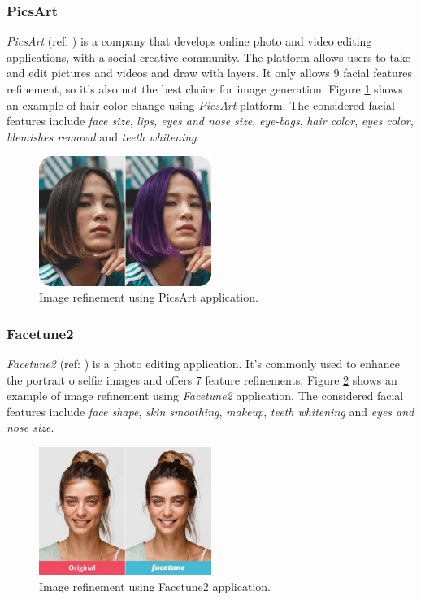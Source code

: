 \subsubsection{PicsArt}
\emph{PicsArt} (ref: ) is a company that develops online photo and video editing applications, with a social creative community. The platform allows users to take and edit pictures and videos and draw with layers. It only allows $9$ facial features refinement, so it's also not the best choice for image generation. Figure \ref{fig:picsArt} shows an example of hair color change using \emph{PicsArt} platform. The considered facial features include \emph{face size}, \emph{lips, eyes and nose size}, \emph{eye-bags}, \emph{hair color}, \emph{eyes color}, \emph{blemishes removal} and \emph{teeth whitening}.

\begin{figure}[H]
    \centering
    \includegraphics[width=0.5\textwidth]{images/picsArt.png}
    \caption{Image refinement using PicsArt application.}
    \label{fig:picsArt}
\end{figure}

\subsubsection{Facetune2}
\emph{Facetune2} (ref: ) is a photo editing application. It's commonly used to enhance the portrait o selfie images and offers $7$ feature refinements. Figure \ref{fig:FaceTune2} shows an example of image refinement using \emph{Facetune2} application. The considered facial features include \emph{face shape}, \emph{skin smoothing}, \emph{makeup}, \emph{teeth whitening} and \emph{eyes and nose size}.

\begin{figure}[H]
    \centering
    \includegraphics[width=0.5\textwidth]{images/FaceTune.jpg}
    \caption{Image refinement using Facetune2 application.}
    \label{fig:FaceTune2}
\end{figure}


